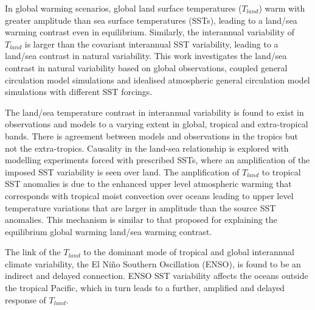 In global warming scenarios, global land surface temperatures ($T_{land}$) warm 
with greater amplitude than sea surface temperatures (SSTs), leading to a 
land/sea warming contrast even in equilibrium. Similarly, the interannual 
variability of $T_{land}$ is larger than the covariant interannual SST
variability, leading to a land/sea contrast in natural variability.  This work 
investigates the land/sea contrast in natural variability based on global 
observations, coupled general circulation model simulations and idealised 
atmospheric general circulation model simulations with different SST forcings. 

The land/sea temperature contrast in interannual variability is found to exist 
in observations and models to a varying extent in global, tropical and 
extra-tropical bands. There is agreement between models and observations in the 
tropics but not the extra-tropics. Causality in the land-sea relationship is 
explored with modelling experiments forced with prescribed SSTs, where an 
amplification of the imposed SST variability is seen over land.  The 
amplification of $T_{land}$ to tropical SST anomalies is due to the enhanced 
upper level atmospheric warming that corresponds with tropical moist convection 
over oceans leading to upper level temperature variations that are larger in 
amplitude than the source SST anomalies. This mechanism is similar to that 
proposed for explaining the equilibrium global warming land/sea warming 
contrast.

The link of the $T_{land}$ to the dominant mode of tropical and global 
interannual climate variability, the El Ni{\~n}o Southern Oscillation (ENSO), is 
found to be an indirect and delayed connection. ENSO SST variability affects the 
oceans outside the tropical Pacific, which in turn leads to a further, amplified 
and delayed response of $T_{land}$.